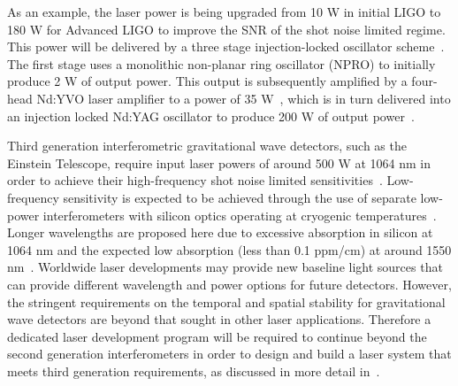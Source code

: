 \documentclass{article}
\begin{document}
As an example, the laser power is being upgraded from 10 W in initial LIGO to
180 W for Advanced LIGO to improve the SNR of the shot noise limited regime.
This power will be delivered by a three stage injection-locked oscillator
scheme~\cite{Cregut, Nabors, Golla, Frede:2005}.  The first stage uses a
monolithic non-planar ring oscillator (NPRO) to initially produce 2 W of output
power.  This output is subsequently amplified by a four-head Nd:YVO laser
amplifier to a power of 35 W~\cite{Frede:2007}, which is in turn delivered into
an injection locked Nd:YAG oscillator to produce 200 W of output
power~\cite{Wilke:2008}.

Third generation interferometric gravitational wave detectors, such as the
Einstein Telescope, require input laser powers of around 500 W at 1064 nm in
order to achieve their high-frequency shot noise limited
sensitivities~\cite{Hild:2010}.  Low-frequency sensitivity is expected to be
achieved through the use of separate low-power interferometers with silicon
optics operating at cryogenic temperatures~\cite{Rowan:2003, Punturo:2010}.
Longer wavelengths are proposed here due to excessive absorption in silicon at
1064 nm and the expected low absorption (less than 0.1 ppm/cm) at around 1550
nm~\cite{Green:1995}. Worldwide laser developments may provide new baseline
light sources that can provide different wavelength and power options for future
detectors. However, the stringent requirements on the temporal and spatial
stability for gravitational wave detectors are beyond that sought in other
laser applications. Therefore a dedicated laser development program will be
required to continue beyond the second generation interferometers in order to
design and build a laser system that meets third generation requirements, as
discussed in more detail in~\cite{Mavalvala:2010}.

\end{document}
